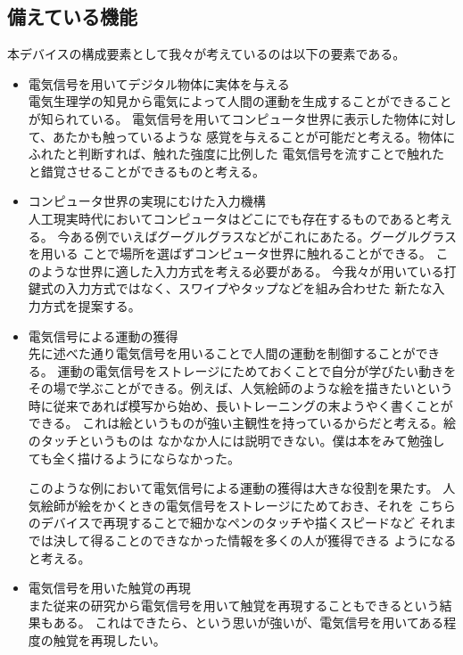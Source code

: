 \documentclass[11pt,onecolumn]{jsarticle}
\begin{document}
\subsection{備えている機能}
本デバイスの構成要素として我々が考えているのは以下の要素である。
\begin{itemize}
\item 電気信号を用いてデジタル物体に実体を与える\\
電気生理学の知見から電気によって人間の運動を生成することができることが知られている。
電気信号を用いてコンピュータ世界に表示した物体に対して、あたかも触っているような
感覚を与えることが可能だと考える。物体にふれたと判断すれば、触れた強度に比例した
電気信号を流すことで触れたと錯覚させることができるものと考える。

\item コンピュータ世界の実現にむけた入力機構\\
人工現実時代においてコンピュータはどこにでも存在するものであると考える。
今ある例でいえばグーグルグラスなどがこれにあたる。グーグルグラスを用いる
ことで場所を選ばずコンピュータ世界に触れることができる。
このような世界に適した入力方式を考える必要がある。
今我々が用いている打鍵式の入力方式ではなく、スワイプやタップなどを組み合わせた
新たな入力方式を提案する。

\item 電気信号による運動の獲得\\
先に述べた通り電気信号を用いることで人間の運動を制御することができる。
運動の電気信号をストレージにためておくことで自分が学びたい動きを
その場で学ぶことができる。例えば、人気絵師のような絵を描きたいという
時に従来であれば模写から始め、長いトレーニングの末ようやく書くことができる。
これは絵というものが強い主観性を持っているからだと考える。絵のタッチというものは
なかなか人には説明できない。僕は本をみて勉強しても全く描けるようにならなかった。

このような例において電気信号による運動の獲得は大きな役割を果たす。
人気絵師が絵をかくときの電気信号をストレージにためておき、それを
こちらのデバイスで再現することで細かなペンのタッチや描くスピードなど
それまでは決して得ることのできなかった情報を多くの人が獲得できる
ようになると考える。

\item 電気信号を用いた触覚の再現\\
また従来の研究から電気信号を用いて触覚を再現することもできるという結果もある。
これはできたら、という思いが強いが、電気信号を用いてある程度の触覚を再現したい。
\end{itemize}
\end{document}
